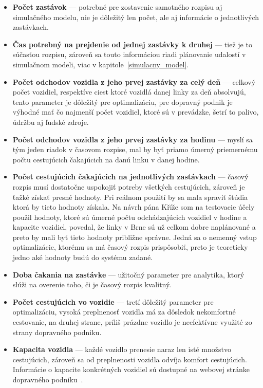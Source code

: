 \begin{itemize}
  \item \textbf{Počet zastávok} --- potrebné pre zostavenie samotného rozpisu aj simulačného modelu, nie je dôležitý len počet, ale aj informácie o jednotlivých zastávkach.
  \item \textbf{Čas potrebný na prejdenie od jednej zastávky k druhej} --- tiež je to súčasťou rozpisu, zároveň sa touto informáciou riadi plánovanie udalostí v simulačnom modeli, viac v kapitole~\ref{simulacny_model}.
  \item \textbf{Počet odchodov vozidla z jeho prvej zastávky za celý deň} --- celkový počet vozidiel, respektíve ciest ktoré vozidlá danej linky za deň absolvujú, tento parameter je dôležitý pre optimalizáciu, pre dopravný podnik je výhodné mať čo najmenší počet vozidiel, ktoré sú v prevádzke, šetrí to palivo, údržbu aj ľudské zdroje.
  \item \textbf{Počet odchodov vozidla z jeho prvej zastávky za hodinu} --- myslí sa tým jeden riadok v časovom rozpise, mal by byť priamo úmerný priemernému počtu cestujúcich čakajúcich na danú linku v danej hodine.
  \item \textbf{Počet cestujúcich čakajúcich na jednotlivých zastávkach} --- časový rozpis musí dostatočne uspokojiť potreby všetkých cestujúcich, zároveň je ťažké získať presné hodnoty. Pri reálnom použití by sa mala spraviť štúdia ktorá by tieto hodnoty získala. Na návrh pána Kříže som na testovacie účely použil hodnoty, ktoré sú úmerné počtu odchádzajúcich vozidiel v hodine a kapacite vozidiel, povedal, že linky v Brne sú už celkom dobre naplánované a preto by mali byť tieto hodnoty približne správne. Jedná sa o nemenný vstup optimalizácie, ktorému sa má časový rozpis prispôsobiť, preto je teoreticky jedno aké hodnoty budú do systému zadané.
  \item \textbf{Doba čakania na zastávke} --- užitočný parameter pre analytika, ktorý slúži na overenie toho, či je časový rozpis kvalitný.
  \item \textbf{Počet cestujúcich vo vozidie} --- tretí dôležitý parameter pre optimalizáciu, vysoká preplnenosť vozidla má za dôsledok nekomfortné cestovanie, na druhej strane, príliš prázdne vozidlo je neefektívne využité zo strany dopravného podniku.
  \item \textbf{Kapacita vozidla} --- každé vozidlo prenesie naraz len isté množstvo cestujúcich, zároveň sa od preplnenosti vozidla odvíja komfort cestujúcich. Informácie o kapacite konkrétných vozidiel sú dostupné na webovej stránke dopravného podniku~\cite{dpmb_vozy}.

\end{itemize}

